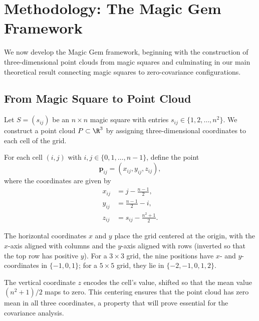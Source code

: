 \section{Methodology: The Magic Gem Framework}
\label{sec:methodology}

We now develop the Magic Gem framework, beginning with the construction of three-dimensional point clouds 
from magic squares and culminating in our main theoretical result connecting magic squares to zero-covariance configurations.

\subsection{From Magic Square to Point Cloud}

Let $S = (s_{ij})$ be an $n \times n$ magic square with entries $s_{ij} \in \{1, 2, \ldots, n^2\}$.
We construct a point cloud $P \subset \R^3$ by assigning three-dimensional coordinates to each cell of the grid.

\begin{definition}
\label{def:gem_coords}
For each cell $(i, j)$ with $i, j \in \{0, 1, \ldots, n-1\}$, define the point
\begin{equation}
\mathbf{p}_{ij} = \left( x_{ij}, y_{ij}, z_{ij} \right),
\end{equation}
where the coordinates are given by
\begin{align}
x_{ij} &= j - \frac{n-1}{2}, \label{eq:x_coord} \\
y_{ij} &= \frac{n-1}{2} - i, \label{eq:y_coord} \\
z_{ij} &= s_{ij} - \frac{n^2 + 1}{2}. \label{eq:z_coord}
\end{align}
\end{definition}

The horizontal coordinates $x$ and $y$ place the grid centered at the origin,
with the $x$-axis aligned with columns and the $y$-axis aligned with rows (inverted so that the top row has positive $y$).
For a $3 \times 3$ grid, the nine positions have $x$- and $y$-coordinates in $\{-1, 0, 1\}$;
for a $5 \times 5$ grid, they lie in $\{-2, -1, 0, 1, 2\}$.

The vertical coordinate $z$ encodes the cell's value, shifted so that the mean value $(n^2 + 1)/2$ maps to zero.
This centering ensures that the point cloud has zero mean in all three coordinates,
a property that will prove essential for the covariance analysis.

